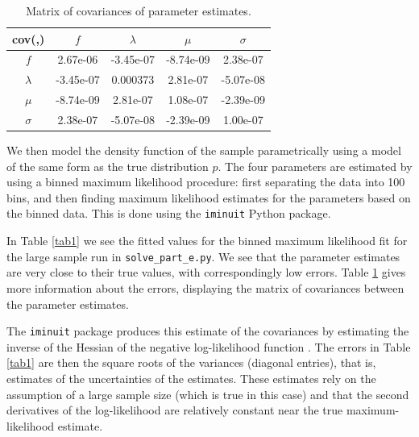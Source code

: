 \documentclass[12pt]{article}
\begin{document}
\begin{table}[htp]
    \centering
    \begin{tabular}{| c | c | c | c | c |}
        \hline
        cov(,) & $f$ & $\lambda$ & $\mu$ & $\sigma$ \\
        \hline
        $f$       & 2.67e-06  & -3.45e-07 & -8.74e-09 &  2.38e-07 \\
        \hline
        $\lambda$ & -3.45e-07 &  0.000373 &  2.81e-07 & -5.07e-08 \\
        \hline
        $\mu$     & -8.74e-09 &  2.81e-07 &  1.08e-07 & -2.39e-09 \\
        \hline
        $\sigma$  & 2.38e-07  & -5.07e-08 & -2.39e-09 &  1.00e-07 \\
        \hline
\end{tabular}
\caption{Matrix of covariances of parameter estimates.}
\label{tab2}
\end{table}

We then model the density function of the sample parametrically using a model of the same form as the true distribution $p$.
The four parameters are estimated by using a binned maximum likelihood procedure: first separating the data into 100 bins, and then finding maximum likelihood estimates for the parameters based on the binned data.
This is done using the \texttt{iminuit} Python package.

In Table \ref{tab1} we see the fitted values for the binned maximum likelihood fit for the large sample run in \texttt{solve\_part\_e.py}.
We see that the parameter estimates are very close to their true values, with correspondingly low errors.
Table \ref{tab2} gives more information about the errors, displaying the matrix of covariances between the parameter estimates.

The \texttt{iminuit} package produces this estimate of the covariances by estimating the inverse of the Hessian of the negative log-likelihood function \cite{iminuit}.
The errors in Table \ref{tab1} are then the square roots of the variances (diagonal entries), that is, estimates of the uncertainties of the estimates.
These estimates rely on the assumption of a large sample size (which is true in this case) and that the second derivatives of the log-likelihood are relatively constant near the true maximum-likelihood estimate.
\end{document}
